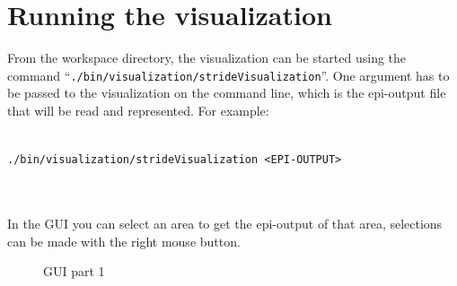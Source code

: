 \section{Running the visualization}	

From the workspace directory, the visualization can be started  using the command \mbox{``\texttt{./bin/visualization/strideVisualization}''}. One argument has to be passed to the visualization on the command line, which is the epi-output file that will be read and represented. For example: \\ \\
\centerline{\texttt{./bin/visualization/strideVisualization \textless EPI-OUTPUT\textgreater}} \\ \\
In the GUI you can select an area to get the epi-output of that area, selections can be made with the right mouse button.

\begin{center}
	\begin{figure}[hbtp!]
		\caption{GUI part 1} \label{gui1}
	\end{figure}
\end{center}

